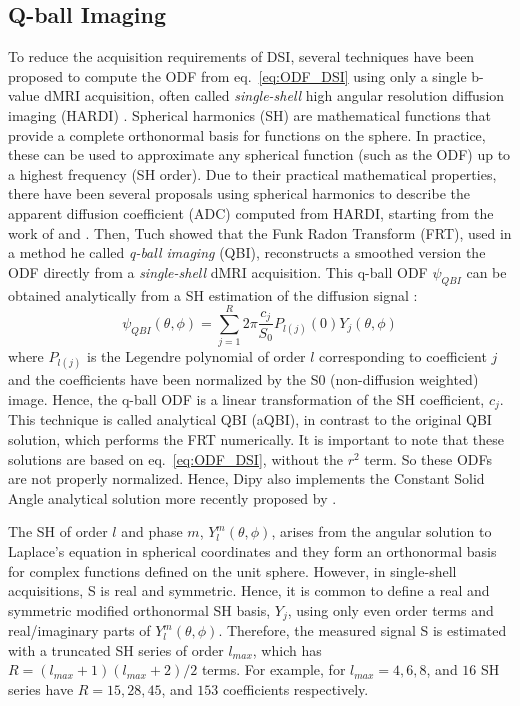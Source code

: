 \documentclass{bioinfo}
\begin{document}
\subsection{Q-ball Imaging}
To reduce the acquisition requirements of DSI, several techniques
have been proposed to compute the ODF from eq.~\ref{eq:ODF_DSI}
using only a single b-value dMRI acquisition, often called
\emph{single-shell} high angular resolution diffusion imaging (HARDI)
\citep{tuch-reese-etal:02,descoteaux-deriche-etal:11}.
Spherical harmonics (SH) are mathematical functions that provide
a complete orthonormal basis for functions on the sphere. In practice, these
can be used to approximate any spherical function (such as the ODF) up to a
highest frequency (SH order). Due to their practical mathematical properties,
there have been several proposals using spherical harmonics to describe
the apparent diffusion coefficient (ADC) computed from HARDI, starting from the
work of \citet{Frank2001, Frank2002, alexander-barker-etal:02} and
\citet{tuch-reese-etal:02}. Then, Tuch showed that the Funk Radon Transform
(FRT), used in a method he called \emph{q-ball imaging} (QBI),
reconstructs a smoothed version the ODF directly from a
\emph{single-shell} dMRI acquisition. This q-ball ODF $\psi_{QBI}$ can
be obtained analytically from a
SH estimation of the diffusion signal \citep{descoteaux-angelino-etal:07,
  hess-mukherjee-etal:06, anderson:05}:
\begin{equation}\label{eq.qball}
\psi_{QBI}(\theta, \phi) = \sum_{j=1}^{R} 2\pi \frac{c_j}{S_0} P_{l(j)} (0) Y_{j} (\theta, \phi)
\end{equation}
where $P_{l(j)}$ is the Legendre polynomial of order $l$ corresponding to
coefficient $j$ and the coefficients have been normalized by the S0
(non-diffusion weighted)
image. Hence, the q-ball ODF is a linear transformation of the SH coefficient,
$c_j$. This technique is called analytical QBI (aQBI), in contrast to the
original QBI solution, which performs the FRT numerically. It is
important to note that these solutions are based on
eq.~\ref{eq:ODF_DSI}, without the $r^2$ term. So these ODFs are
not properly normalized. Hence, Dipy also implements
the Constant Solid Angle analytical solution more recently proposed by
\citep{aganj-lenglet-etal:10,tristan-vega-westin-etal:09}.

The SH of order $l$
and phase $m$, $Y_{l}^{m}(\theta, \phi)$, arises from the angular solution to
Laplace's equation in spherical coordinates and they form an orthonormal basis
for complex functions defined on the unit sphere. However, in single-shell
acquisitions, S is real and symmetric.
Hence, it is common to define a real and
symmetric modified orthonormal SH basis, $Y_{j}$, using only even order terms
and real/imaginary parts of $Y_{l}^{m}(\theta, \phi)$. Therefore, the measured
signal S is estimated with a truncated SH series of order $l_{max}$, which has
$R = (l_{max} +1)( l_{max} +2)/2$ terms. For example, for $l_{max} = 4, 6, 8$,
and $16$ SH series have $R = 15, 28, 45$, and $153$ coefficients respectively.
\end{document}
